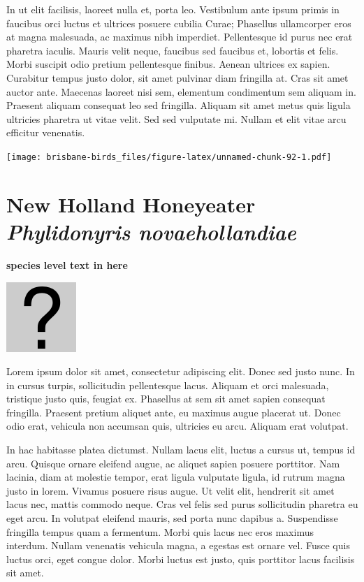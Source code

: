 \documentclass[]{book}
\let\origfigure\figure
\let\endorigfigure\endfigure
\renewenvironment{figure}[1][2] {
  \expandafter\origfigure\expandafter[H]
} {
  \endorigfigure
}
\begin{document}
In ut elit facilisis, laoreet nulla et, porta leo. Vestibulum ante ipsum
primis in faucibus orci luctus et ultrices posuere cubilia Curae;
Phasellus ullamcorper eros at magna malesuada, ac maximus nibh
imperdiet. Pellentesque id purus nec erat pharetra iaculis. Mauris velit
neque, faucibus sed faucibus et, lobortis et felis. Morbi suscipit odio
pretium pellentesque finibus. Aenean ultrices ex sapien. Curabitur
tempus justo dolor, sit amet pulvinar diam fringilla at. Cras sit amet
auctor ante. Maecenas laoreet nisi sem, elementum condimentum sem
aliquam in. Praesent aliquam consequat leo sed fringilla. Aliquam sit
amet metus quis ligula ultricies pharetra ut vitae velit. Sed sed
vulputate mi. Nullam et elit vitae arcu efficitur venenatis.

\begin{figure}
\centering
\texttt{[image: brisbane-birds\_files/figure-latex/unnamed-chunk-92-1.pdf]}
\caption{\label{fig:unnamed-chunk-92}insert figure caption}
\end{figure}

\section{\texorpdfstring{New Holland Honeyeater \emph{Phylidonyris
novaehollandiae}}{New Holland Honeyeater Phylidonyris novaehollandiae}}\label{new-holland-honeyeater-phylidonyris-novaehollandiae}

\textbf{species level text in here}

\begin{figure}
\centering
\includegraphics{assets/missing.png}
\caption{No image for species}
\end{figure}

Lorem ipsum dolor sit amet, consectetur adipiscing elit. Donec sed justo
nunc. In in cursus turpis, sollicitudin pellentesque lacus. Aliquam et
orci malesuada, tristique justo quis, feugiat ex. Phasellus at sem sit
amet sapien consequat fringilla. Praesent pretium aliquet ante, eu
maximus augue placerat ut. Donec odio erat, vehicula non accumsan quis,
ultricies eu arcu. Aliquam erat volutpat.

In hac habitasse platea dictumst. Nullam lacus elit, luctus a cursus ut,
tempus id arcu. Quisque ornare eleifend augue, ac aliquet sapien posuere
porttitor. Nam lacinia, diam at molestie tempor, erat ligula vulputate
ligula, id rutrum magna justo in lorem. Vivamus posuere risus augue. Ut
velit elit, hendrerit sit amet lacus nec, mattis commodo neque. Cras vel
felis sed purus sollicitudin pharetra eu eget arcu. In volutpat eleifend
mauris, sed porta nunc dapibus a. Suspendisse fringilla tempus quam a
fermentum. Morbi quis lacus nec eros maximus interdum. Nullam venenatis
vehicula magna, a egestas est ornare vel. Fusce quis luctus orci, eget
congue dolor. Morbi luctus est justo, quis porttitor lacus facilisis sit
amet.
\end{document}

